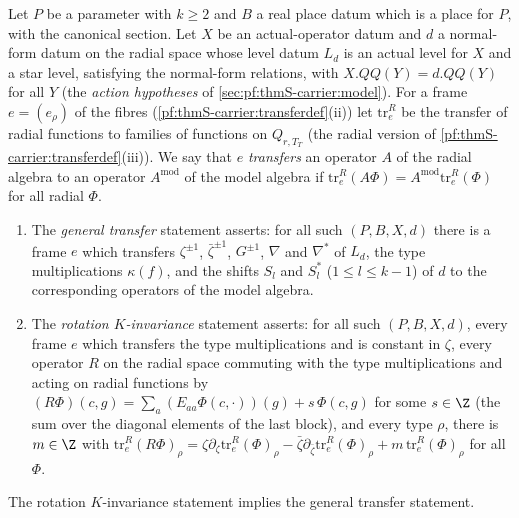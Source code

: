 \begin{definition}\label{pf:sh-curv:gtdef}
Let $P$ be a parameter with $k\ge2$ and $B$ a real place datum which is a place for $P$, with the canonical section. Let
$X$ be an actual-operator datum and $d$ a normal-form datum on the radial space whose level datum $L_d$ is an actual level for
$X$ and a star level, satisfying the normal-form relations, with $X.QQ(Y)=d.QQ(Y)$ for all $Y$ (the \emph{action
hypotheses} of \cref{sec:pf:thmS-carrier:model}). For a frame $e=(e_\rho)$ of the fibres (\cref{pf:thmS-carrier:transferdef}(ii))
let $\mathrm{tr}^R_e$ be the transfer of radial functions to families of functions on $Q_{r,T_T}$ (the radial version of
\cref{pf:thmS-carrier:transferdef}(iii)). We say that $e$ \emph{transfers} an operator $A$ of the radial algebra to an operator
$A^{\mathrm{mod}}$ of the model algebra if $\mathrm{tr}^R_e(A\Phi)=A^{\mathrm{mod}}\mathrm{tr}^R_e(\Phi)$ for all radial
$\Phi$.
\begin{enumerate}[label=(\alph*)]
\item The \emph{general transfer} statement asserts: for all such $(P,B,X,d)$ there is a frame $e$ which transfers
$\zeta^{\pm1}$, $\bar\zeta^{\pm1}$, $G^{\pm1}$, $\nabla$ and $\nabla^*$ of $L_d$, the type multiplications $\kappa(f)$, and the
shifts $S_l$ and $S_l^*$ ($1\le l\le k-1$) of $d$ to the corresponding operators of the model algebra.
\item The \emph{rotation $K$-invariance} statement asserts: for all such $(P,B,X,d)$, every frame $e$ which transfers the type
multiplications and is constant in $\zeta$, every operator $R$ on the radial space commuting with the type multiplications
and acting on radial functions by $(R\Phi)(c,g)=\sum_a(E_{aa}\Phi(c,\cdot))(g)+s\,\Phi(c,g)$ for some $s\in\Z$ (the sum over the
diagonal elements of the last block), and every type $\rho$, there is $m\in\Z$ with
$\mathrm{tr}^R_e(R\Phi)_\rho=\zeta\partial_\zeta\mathrm{tr}^R_e(\Phi)_\rho-\bar\zeta\partial_{\bar\zeta}\mathrm{tr}^R_e(\Phi)_\rho
+m\,\mathrm{tr}^R_e(\Phi)_\rho$ for all $\Phi$.
\end{enumerate}
\end{definition}

\begin{theorem}\label{pf:sh-curv:gentransfer}
The rotation $K$-invariance statement implies the general transfer statement.
\end{theorem}

